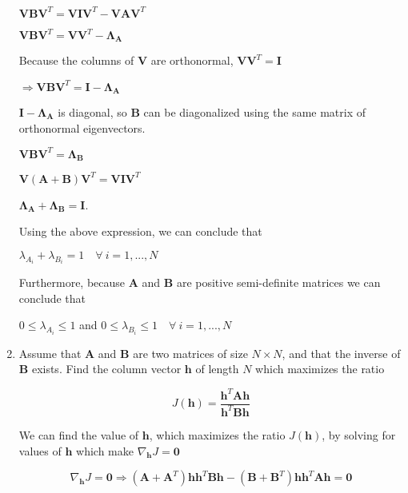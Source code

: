 \documentclass[fleqn]{article}
\begin{document}
\begin{enumerate}
		$\mathbf{V}\mathbf{B}\mathbf{V}^T = \mathbf{V}\mathbf{I}\mathbf{V}^T - \mathbf{V}\mathbf{A}\mathbf{V}^T$
		
		$\mathbf{V}\mathbf{B}\mathbf{V}^T = \mathbf{V}\mathbf{V}^T - \mathbf{\Lambda_A}$
		
		Because the columns of $\mathbf{V}$ are orthonormal, $\mathbf{V}\mathbf{V}^T = \mathbf{I}$
		
		$\Rightarrow \mathbf{V}\mathbf{B}\mathbf{V}^T = \mathbf{I} - \mathbf{\Lambda_A}$
		
		$\mathbf{I} - \mathbf{\Lambda_A}$ is diagonal, so $\mathbf{B}$ can be diagonalized using the same matrix of orthonormal eigenvectors.
		
		$\mathbf{V}\mathbf{B}\mathbf{V}^T = \mathbf{\Lambda_B}$		
		
		$\mathbf{V}(\mathbf{A} + \mathbf{B})\mathbf{V}^T = \mathbf{V}\mathbf{I}\mathbf{V}^T$
		
		$\mathbf{\Lambda_A} + \mathbf{\Lambda_B} = \mathbf{I}$.
		
		Using the above expression, we can conclude that
		
		$\lambda_{A_i} + \lambda_{B_i} = 1\quad \forall\ i = 1,...,N$
		
		Furthermore, because $\mathbf{A}$ and $\mathbf{B}$ are positive semi-definite matrices we can conclude that
		
		$0 \leq \lambda_{A_i} \leq 1$ and $0 \leq \lambda_{B_i} \leq 1 \quad \forall\ i = 1,...,N$
		
		\item Assume that $\mathbf{A}$ and $\mathbf{B}$ are two matrices of size $N \times N$, and that the inverse of $\mathbf{B}$ exists. Find the column vector $\mathbf{h}$ of length $N$ which maximizes the ratio
		
		\begin{equation*}
			J(\mathbf{h}) = \frac{\mathbf{h}^T\mathbf{A}\mathbf{h}}{\mathbf{h}^T\mathbf{B}\mathbf{h}}
		\end{equation*}
		
		We can find the value of $\mathbf{h}$, which maximizes the ratio $J(\mathbf{h})$, by solving for values of $\mathbf{h}$ which make $\nabla_\mathbf{h}J = \mathbf{0}$ 
		
		\begin{equation*}
			\nabla_\mathbf{h}J = \mathbf{0} \Rightarrow (\mathbf{A} + \mathbf{A}^T)\mathbf{h}\mathbf{h}^T\mathbf{B}\mathbf{h} - (\mathbf{B} + \mathbf{B}^T)\mathbf{h}\mathbf{h}^T\mathbf{A}\mathbf{h} = \mathbf{0}
		\end{equation*}
		

\end{enumerate}
\end{document}
